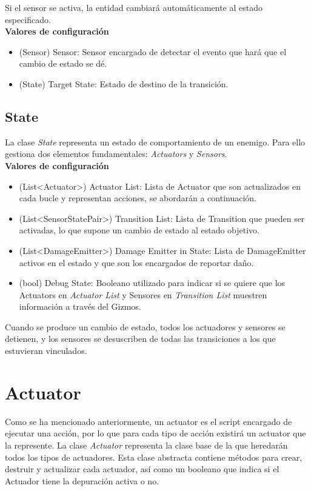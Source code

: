 Si el sensor se activa, la entidad cambiará automáticamente al estado especificado.\\

\textbf{Valores de configuración}
\begin{itemize}
	\item (Sensor) Sensor: Sensor encargado de detectar el evento que hará que el cambio de estado se dé.
	\item (State) Target State: Estado de destino de la transición.
\end{itemize}

\subsection{State}

La clase \textit{State} representa un estado de comportamiento de un enemigo. Para ello gestiona dos elementos fundamentales: \textit{Actuators} y \textit{Sensors}.\\

\textbf{Valores de configuración}
\begin{itemize}
	\item (List<Actuator>) Actuator List: Lista de Actuator que son actualizados en cada bucle y representan acciones, se abordarán a continuación.
	\item (List<SensorStatePair>) Transition List: Lista de Transition que pueden ser activadas, lo que supone un cambio de estado al estado objetivo.
	\item (List<DamageEmitter>) Damage Emitter in State: Lista de DamageEmitter activos en el estado y que son los encargados de reportar daño.
	\item (bool) Debug State: Booleano utilizado para indicar si se quiere que los Actuators en \textit{Actuator List} y Sensores en \textit{Transition List} muestren información a través del Gizmos.
\end{itemize}
Cuando se produce un cambio de estado, todos los actuadores y sensores se detienen, y los sensores se desuscriben de todas las transiciones a los que estuvieran vinculados.\\

\section{Actuator}

Como se ha mencionado anteriormente, un actuator es el script encargado de ejecutar una acción, por lo que para cada tipo de acción existirá un actuator que la represente.
La clase \textit{Actuator} representa la clase base de la que heredarán todos los tipos de actuadores.
Esta clase abstracta contiene métodos para crear, destruir y actualizar cada actuador, así como un booleano que indica si el Actuador tiene la depuración activa o no.\\

